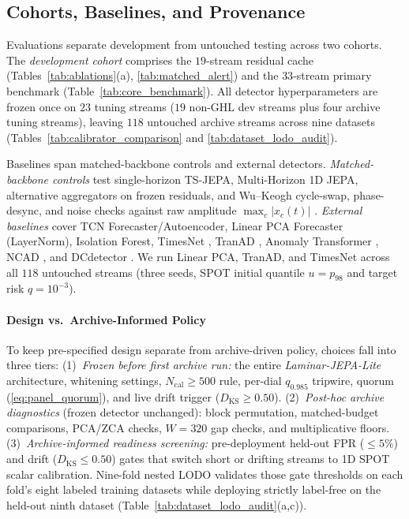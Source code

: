 \documentclass[journal]{IEEEtran}
\begin{document}
\subsection{Cohorts, Baselines, and Provenance}
\label{subsec:cohort_repro}
Evaluations separate development from untouched testing across two cohorts. The \emph{development cohort} comprises the $19$-stream residual cache (Tables~\ref{tab:ablations}(a), \ref{tab:matched_alert}) and the $33$-stream primary benchmark (Table~\ref{tab:core_benchmark}). All detector hyperparameters are frozen once on $23$ tuning streams ($19$ non-GHL dev streams plus four archive tuning streams), leaving $118$ untouched archive streams across nine datasets (Tables~\ref{tab:calibrator_comparison} and \ref{tab:dataset_lodo_audit}).

Baselines span matched-backbone controls and external detectors. \emph{Matched-backbone controls} test single-horizon TS-JEPA, Multi-Horizon 1D JEPA, alternative aggregators on frozen residuals, and Wu--Keogh cycle-swap, phase-desync, and noise checks against raw amplitude $\max_c|x_c(t)|$ \cite{wu2023flawed}. \emph{External baselines} cover TCN Forecaster/Autoencoder, Linear PCA Forecaster (LayerNorm), Isolation Forest, TimesNet \cite{wu2023timesnet}, TranAD \cite{tuli2022tranad}, Anomaly Transformer \cite{xu2022anomaly}, NCAD \cite{carmona2021neural}, and DCdetector \cite{yang2023dcdetector}. We run Linear PCA, TranAD, and TimesNet across all $118$ untouched streams (three seeds, SPOT initial quantile $u=p_{98}$ and target risk $q=10^{-3}$).

\paragraph{Design vs.\ Archive-Informed Policy}
To keep pre-specified design separate from archive-driven policy, choices fall into three tiers:
(1)~\emph{Frozen before first archive run:} the entire \emph{Laminar-JEPA-Lite} architecture, whitening settings, $N_{\text{cal}} \ge 500$ rule, per-dial $q_{0.985}$ tripwire, quorum (\ref{eq:panel_quorum}), and live drift trigger ($D_{\text{KS}} \ge 0.50$).
(2)~\emph{Post-hoc archive diagnostics} (frozen detector unchanged): block permutation, matched-budget comparisons, PCA/ZCA checks, $W=320$ gap checks, and multiplicative floors.
(3)~\emph{Archive-informed readiness screening:} pre-deployment held-out FPR ($\le 5\%$) and drift ($D_{\text{KS}} \le 0.50$) gates that switch short or drifting streams to 1D SPOT scalar calibration. Nine-fold nested LODO validates those gate thresholds on each fold's eight labeled training datasets while deploying strictly label-free on the held-out ninth dataset (Table~\ref{tab:dataset_lodo_audit}(a,c)).
\end{document}
